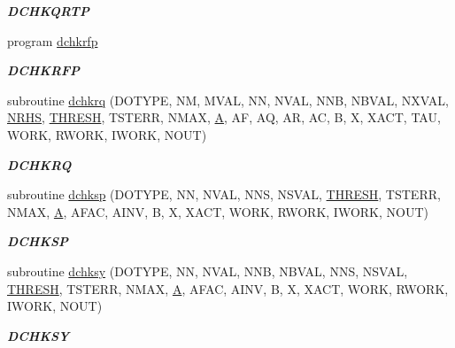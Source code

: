 \begin{DoxyCompactItemize}
\begin{DoxyCompactList}\small\item\em {\bfseries D\+C\+H\+K\+Q\+R\+T\+P} \end{DoxyCompactList}\item 
program \hyperlink{group__double__lin_ga6dc9e833fd37f2fd47c903496ae4fb7d}{dchkrfp}
\begin{DoxyCompactList}\small\item\em {\bfseries D\+C\+H\+K\+R\+F\+P} \end{DoxyCompactList}\item 
subroutine \hyperlink{group__double__lin_ga614d4362946cf8e9cc1b7b4434624809}{dchkrq} (D\+O\+T\+Y\+P\+E, N\+M, M\+V\+A\+L, N\+N, N\+V\+A\+L, N\+N\+B, N\+B\+V\+A\+L, N\+X\+V\+A\+L, \hyperlink{example__user_8c_aa0138da002ce2a90360df2f521eb3198}{N\+R\+H\+S}, \hyperlink{zlaqgs_8c_a0656018abfc9fa2821827415f5d5ea57}{T\+H\+R\+E\+S\+H}, T\+S\+T\+E\+R\+R, N\+M\+A\+X, \hyperlink{classA}{A}, A\+F, A\+Q, A\+R, A\+C, B, X, X\+A\+C\+T, T\+A\+U, W\+O\+R\+K, R\+W\+O\+R\+K, I\+W\+O\+R\+K, N\+O\+U\+T)
\begin{DoxyCompactList}\small\item\em {\bfseries D\+C\+H\+K\+R\+Q} \end{DoxyCompactList}\item 
subroutine \hyperlink{group__double__lin_gaaebb024f33cb783fc4c8e1372d3f5aa4}{dchksp} (D\+O\+T\+Y\+P\+E, N\+N, N\+V\+A\+L, N\+N\+S, N\+S\+V\+A\+L, \hyperlink{zlaqgs_8c_a0656018abfc9fa2821827415f5d5ea57}{T\+H\+R\+E\+S\+H}, T\+S\+T\+E\+R\+R, N\+M\+A\+X, \hyperlink{classA}{A}, A\+F\+A\+C, A\+I\+N\+V, B, X, X\+A\+C\+T, W\+O\+R\+K, R\+W\+O\+R\+K, I\+W\+O\+R\+K, N\+O\+U\+T)
\begin{DoxyCompactList}\small\item\em {\bfseries D\+C\+H\+K\+S\+P} \end{DoxyCompactList}\item 
subroutine \hyperlink{group__double__lin_gaed20cca74e55e9252051d91f329a8bc3}{dchksy} (D\+O\+T\+Y\+P\+E, N\+N, N\+V\+A\+L, N\+N\+B, N\+B\+V\+A\+L, N\+N\+S, N\+S\+V\+A\+L, \hyperlink{zlaqgs_8c_a0656018abfc9fa2821827415f5d5ea57}{T\+H\+R\+E\+S\+H}, T\+S\+T\+E\+R\+R, N\+M\+A\+X, \hyperlink{classA}{A}, A\+F\+A\+C, A\+I\+N\+V, B, X, X\+A\+C\+T, W\+O\+R\+K, R\+W\+O\+R\+K, I\+W\+O\+R\+K, N\+O\+U\+T)
\begin{DoxyCompactList}\small\item\em {\bfseries D\+C\+H\+K\+S\+Y} \end{DoxyCompactList}\item 

\end{DoxyCompactItemize}
